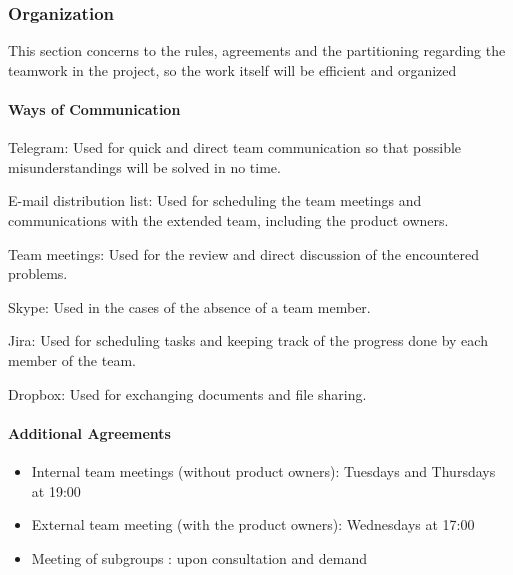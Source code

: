 \newpage

\subsubsection{Organization}

This section concerns to the rules, agreements and the partitioning regarding the teamwork in the project, so the work itself will be efficient and organized

\paragraph{Ways of Communication}
\begin{aims}
	\item[Telegram:] Used for quick and direct team communication so that possible misunderstandings will be solved in no time.
	
	\item[E-mail distribution list:] Used for scheduling the team meetings and communications with the extended team, including the product owners. 
	
	\item[Team meetings:] Used for the review and direct discussion of the encountered problems. 
	
	\item[Skype:] Used in the cases of the absence of a team member. 
	
	\item [Jira:] Used for scheduling tasks and keeping track of the progress done by each member of the team.
	
	\item[Dropbox:] Used for exchanging documents and file sharing.  
\end{aims}

\paragraph{Additional Agreements}
\begin{itemize}
	\item Internal team meetings (without product owners): Tuesdays and Thursdays at 19:00
	
	\item External team meeting (with the product owners): Wednesdays at 17:00
	
	\item Meeting of subgroups : upon consultation and demand 
\end{itemize}

